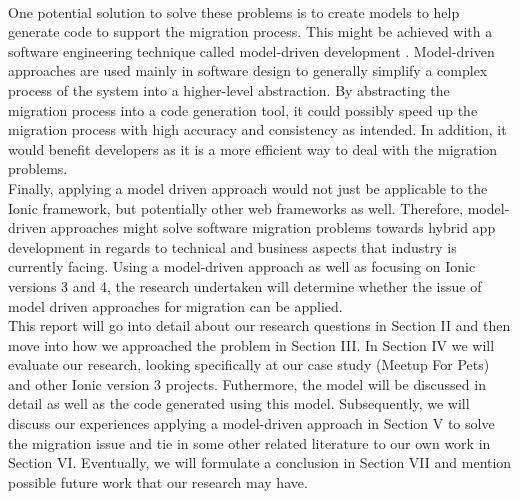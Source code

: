 \documentclass[conference]{IEEEtran}
\begin{document}
\\ One potential solution to solve these problems is to create models to help generate code to support the migration process.
This might be achieved with a software engineering technique called model-driven development \cite{b4}. Model-driven approaches are used mainly in software design to generally
simplify a complex process of the system into a higher-level abstraction. By abstracting the migration process into a code generation tool, it could possibly speed up the
migration process with high accuracy and consistency as intended. In addition, it would benefit developers as it is a more efficient way to deal with the migration problems.
\\ Finally, applying a model driven approach would not just be applicable to the Ionic framework, but potentially other web frameworks as well.
Therefore, model-driven approaches might solve software migration problems towards hybrid app development in regards to technical and business aspects
that industry is currently facing. Using a model-driven approach as well as focusing on Ionic versions 3 and 4, the research undertaken will determine whether
the issue of model driven approaches for migration can be applied.
\\ This report will go into detail about our research questions in Section II and then move into how we approached the problem in Section III. In Section IV we will evaluate our research, looking specifically
at our case study (Meetup For Pets) and other Ionic version 3 projects. Futhermore, the model will be discussed in detail as well as the code generated using this model. Subsequently,  we will discuss our
experiences applying a model-driven approach in Section V to solve the migration issue and tie in some other related literature to our own work in Section VI. Eventually, we will formulate a conclusion in Section VII and mention possible
future work that our research may have.
\end{document}
